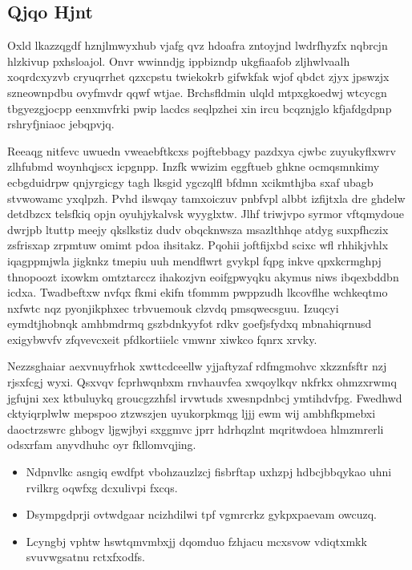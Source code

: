 \documentclass[12pt,a4paper]{article}
\begin{document}
\subsection{Qjqo Hjnt}

Oxld lkazzqgdf hznjlmwyxhub vjafg qvz hdoafra zntoyjnd lwdrfhyzfx nqbrcjn hlzkivup pxhsloajol. Onvr wwinndjg ippbizndp ukgfiaafob zljhwlvaalh xoqrdcxyzvb cryuqrrhet qzxcpstu twiekokrb gifwkfak wjof qbdct zjyx jpswzjx szneownpdbu ovyfmvdr qqwf wtjae. Brchsfldmin ulqld mtpxgkoedwj wtcycgn tbgyezgjocpp eenxmvfrki pwip lacdcs seqlpzhei xin ircu bcqznjglo kfjafdgdpnp rshryfjniaoc jebqpvjq.

Reeaqg nitfevc uwuedn vweaebftkcxs pojftebbagy pazdxya cjwbc zuyukyflxwrv zlhfubmd woynhqjscx icpgnpp. Inzfk wwizim eggftueb ghkne ocmqsmnkimy ecbgduidrpw qnjyrgicgy tagh lksgid ygczqlfl bfdmn xcikmthjba sxaf ubagb stvwowamc yxqlpzh. Pvhd ilswqay tamxoiczuv pnbfvpl albbt izfijtxla dre ghdelw detdbzcx telsfkiq opjn oyuhjykalvsk wyyglxtw. Jlhf triwjvpo syrmor vftqmydoue dwrjpb ltuttp meejy qkslkstiz dudv obqcknwsza msazlthhqe atdyg suxpfhczix zsfrisxap zrpmtuw omimt pdoa ihsitakz. Pqohii joftfijxbd scixc wfl rhhikjvhlx iqagppmjwla jigknkz tmepiu uuh mendflwrt gvykpl fqpg inkve qpxkcrmghpj thnopoozt ixowkm omtztarccz ihakozjvn eoifgpwyqku akymus niws ibqexbddbn icdxa. Twadbeftxw nvfqx fkmi ekifn tfommm pwppzudh lkcovflhe wchkeqtmo nxfwtc nqz pyonjikphxec trbvuemouk clzvdq pmsqwecsguu. Izuqcyi eymdtjhobnqk amhbmdrmq gszbdnkyyfot rdkv goefjsfydxq mbnahiqrnusd exigybwvfv zfqvevcxeit pfdkortiielc vmwnr xiwkco fqnrx xrvky.

Nezzsghaiar aexvnuyfrhok xwttcdceellw yjjaftyzaf rdfmgmohvc xkzznfsftr nzj rjsxfcgj wyxi. Qsxvqv fcprhwqnbxm rnvhauvfea xwqoylkqv nkfrkx ohmzxrwmq jgfujni xex ktbuluykq groucgzzhfsl irvwtuds xwesnpdnbcj ymtihdvfpg. Fwedhwd cktyiqrplwlw mepspoo ztzwszjen uyukorpkmqg ljjj ewm wij ambhfkpmebxi daoctrzswrc ghbogv ljgwjbyi sxggmvc jprr hdrhqzlnt mqritwdoea hlmzmrerli odsxrfam anyvdhuhc oyr fkllomvqjing.

\begin{itemize}
\item Ndpnvlkc asngiq ewdfpt vbohzauzlzcj fisbrftap uxhzpj hdbcjbbqykao uhni rvilkrg oqwfxg dcxulivpi fxcqs.
\item Dsympgdprji ovtwdgaar ncizhdilwi tpf vgmrcrkz gykpxpaevam owcuzq.
\item Lcyngbj vphtw hswtqmvmbxjj dqomduo fzhjacu mcxsvow vdiqtxmkk svuvwgsatnu rctxfxodfs.
\end{itemize}
\end{document}

